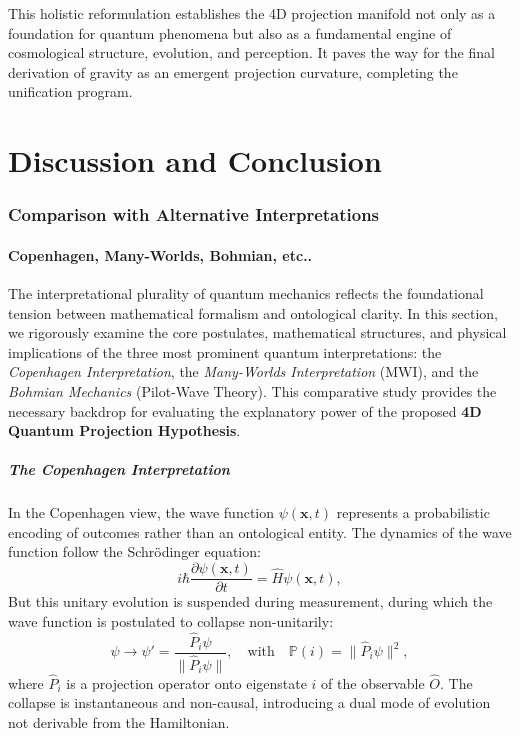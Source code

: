 \documentclass[12pt]{article}
\begin{document}
This holistic reformulation establishes the 4D projection manifold not only as a foundation for quantum phenomena but also as a fundamental engine of cosmological structure, evolution, and perception. It paves the way for the final derivation of gravity as an emergent projection curvature, completing the unification program.


\part{Discussion and Conclusion}

\section{Comparison with Alternative Interpretations}

\subsection{Copenhagen, Many-Worlds, Bohmian, etc..}

The interpretational plurality of quantum mechanics reflects the foundational tension between mathematical formalism and ontological clarity. In this section, we rigorously examine the core postulates, mathematical structures, and physical implications of the three most prominent quantum interpretations: the \emph{Copenhagen Interpretation}, the \emph{Many-Worlds Interpretation} (MWI), and the \emph{Bohmian Mechanics} (Pilot-Wave Theory). This comparative study provides the necessary backdrop for evaluating the explanatory power of the proposed \textbf{4D Quantum Projection Hypothesis}.

\subsubsection*{The Copenhagen Interpretation}

In the Copenhagen view, the wave function $\psi(\mathbf{x}, t)$ represents a probabilistic encoding of outcomes rather than an ontological entity. The dynamics of the wave function follow the Schrödinger equation:
\begin{equation}
i\hbar \frac{\partial \psi(\mathbf{x}, t)}{\partial t} = \hat{H} \psi(\mathbf{x}, t), \label{eq:schrodinger_copenhagen}
\end{equation}
But this unitary evolution is suspended during measurement, during which the wave function is postulated to collapse non-unitarily:
\begin{equation}
\psi \rightarrow \psi' = \frac{\hat{P}_i \psi}{\| \hat{P}_i \psi \|}, \quad \text{with} \quad \mathbb{P}(i) = \| \hat{P}_i \psi \|^2, \label{eq:copenhagen_collapse_revised}
\end{equation}
where $\hat{P}_i$ is a projection operator onto eigenstate $i$ of the observable $\hat{O}$. The collapse is instantaneous and non-causal, introducing a dual mode of evolution not derivable from the Hamiltonian.
\end{document}

